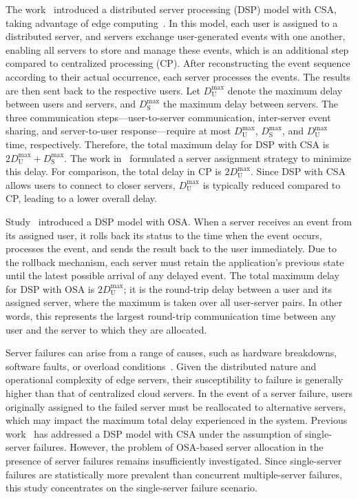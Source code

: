 \documentclass[conference]{IEEEtran}
\begin{document}
\begin{CJK}{UTF8}{ipxm}
The work~\cite{2Kawabata2017} introduced a distributed server processing (DSP) model with CSA, taking advantage of edge computing~\cite{edge_26,edge_27,edge_28,edge_29}. 
In this model, each user is assigned to a distributed server, and servers exchange user-generated events with one another, enabling all servers to store and manage these events, which is an additional step compared to centralized processing (CP). 
After reconstructing the event sequence according to their actual occurrence, each server processes the events.
The results are then sent back to the respective users. 
Let $D_\mathrm{U}^{\max}$ denote the maximum delay between users and servers, and $D_\mathrm{S}^{\max}$ the maximum delay between servers. 
The three communication steps—user-to-server communication, inter-server event sharing, and server-to-user response—require at most $D_\mathrm{U}^{\max}$, $D_\mathrm{S}^{\max}$, and $D_\mathrm{U}^{\max}$ time, respectively. 
Therefore, the total maximum delay for DSP with CSA is $2D_\mathrm{U}^{\max} + D_\mathrm{S}^{\max}$. 
The work in~\cite{2Kawabata2017} formulated a server assignment strategy to minimize this delay. 
For comparison, the total delay in CP is $2D_\mathrm{U}^{\max}$. 
Since DSP with CSA allows users to connect to closer servers, $D_\mathrm{U}^{\max}$ is typically reduced compared to CP, leading to a lower overall delay.

Study~\cite{OSA_Kawabata_2021,OSA_Kawabata_13_Kawabata2020} introduced a DSP model with OSA.
When a server receives an event from its assigned user, it rolls back its status to the time when the event occurs, processes the event, and sends the result back to the user immediately.
Due to the rollback mechanism, each server must retain the application's previous state until the latest possible arrival of any delayed event.
The total maximum delay for DSP with OSA is $2D_\mathrm{U}^{\max}$;
it is the round-trip delay between a user and its assigned server, where the maximum is taken over all user-server pairs. 
In other words, this represents the largest round-trip communication time between any user and the server to which they are allocated.

Server failures can arise from a range of causes, such as hardware breakdowns, software faults, or overload conditions~\cite{5_9_8_Shi2016}. 
Given the distributed nature and operational complexity of edge servers, their susceptibility to failure is generally higher than that of centralized cloud servers.
In the event of a server failure, users originally assigned to the failed server must be reallocated to alternative servers, which may impact the maximum total delay experienced in the system.
Previous work~\cite{5_9_Masuda2020} has addressed a DSP model with CSA under the assumption of single-server failures.
However, the problem of OSA-based server allocation in the presence of server failures remains insufficiently investigated.
Since single-server failures are statistically more prevalent than concurrent multiple-server failures, this study concentrates on the single-server failure scenario.


\end{CJK}
\end{document}
